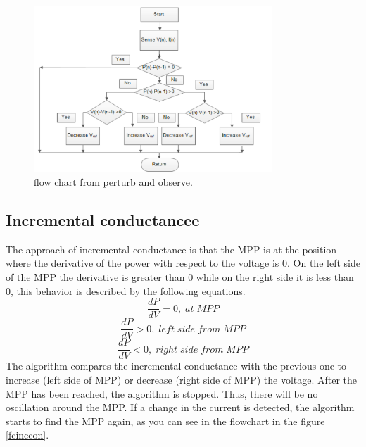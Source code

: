 \begin{figure}[htbp]
	\begin{center}
		\includegraphics[width=0.8\textwidth]{../Pictures/P1/Flow_chart/flow_chart_perturb_observe}
		\caption{flow chart from perturb and observe\cite{PerturbObserveFC}.}
		\label{fcperturbandobserve}
	\end{center}	
\end{figure}

\subsection{Incremental conductancee}
The approach of incremental conductance is that the MPP is at the position where the derivative of the power with respect to the voltage is 0. On the left side of the MPP the derivative is greater than 0 while on the right side it is less than 0, this behavior is described by the following equations.
\begin{equation} \label{Inccond1}
\frac{dP}{dV} = 0 ,\; at\; MPP 
\end{equation} 
\begin{equation} \label{Inccond2}
\frac{dP}{dV} > 0 ,\; left\; side\; from\; MPP 
\end{equation}
\begin{equation} \label{Inccond3}
\frac{dP}{dV} < 0 ,\; right\; side\; from\; MPP
\end{equation}
The algorithm compares the incremental conductance with the previous one to increase (left side of MPP) or decrease (right side of MPP) the voltage. After the MPP has been reached, the algorithm is stopped. Thus, there will be no oscillation around the MPP. If a change in the current is detected, the algorithm starts to find the MPP again, as you can see in the flowchart in the figure \ref{fcinccon}\cite{AN1521_MC}.

